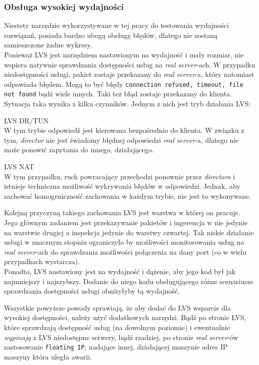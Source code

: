 \subsubsection*{Obsługa wysokiej wydajności}
Niestety narzędzie wykorzystywane w tej pracy do testowania wydajności rozwiązań, posiada bardzo ubogą obsługę błędów, dlatego nie zostaną zamieszczone żadne wykresy.\\
Ponieważ LVS jest narzędziem nastawionym na wydajność i mały rozmiar, nie wspiera natywnie sprawdzania dostępności usług na \textit{real server}-ach.
W przypadku niedostępności usługi, pakiet zostaje przekazany do \textit{real server}-a, który natomiast odpowiada błędem.
Mogą to być błędy \texttt{connection refused, timeout, file not found} bądź wiele innych.
Taki też błąd zostaje przekazany do klienta.\\
Sytuacja taka wynika z kilku czynników.
Jednym z nich jest tryb działania LVS:
\begin{description}
	\item{LVS DR/TUN}\\
		W tym trybie odpowiedź jest kierowana bezpośrednio do klienta.
		W związku z tym, \textit{director} nie jest świadomy błędnej odpowiedzi \textit{real server}-a, dlatego nie może ponowić zapytania do innego, działającego.
	\item{LVS NAT}\\
		W tym przypadku, ruch powracający przechodzi ponownie przez \textit{directora} i istnieje techniczna możliwość wykrywania błędów w odpowiedzi.
		Jednak, aby zachować homogeniczność zachowania w każdym trybie, nie jest to wykonywane.
\end{description}
Kolejną przyczyną takiego zachowania LVS jest warstwa w której on pracuje.
Jego głównym zadaniem jest przekazywanie pakietów i ingerencja w nie jedynie na warstwie drugiej a inspekcja jedynie do warstwy czwartej.
Tak niskie działanie usługi w znacznym stopniu ograniczyło by możliwości monitorowania usług na \textit{real server}-ach do sprawdzania możliwości połączenia na dany port (co w wielu przypadkach wystarcza).\\
Ponadto, LVS nastawiony jest na wydajność i dążenie, aby jego kod był jak najmniejszy i najszybszy.
Dodanie do niego kodu obsługującego różne scenariusze sprawdzania dostępności usługi obniżyłyby tą wydajność.

Wszystkie powyższe powody sprawiają, że aby dodać do LVS wsparcie dla wysokiej dostępności, należy użyć dodatkowych narzędzi.
Bądź po stronie LVS, które sprawdzają dostępność usług (na dowolnym poziomie) i ewentualnie \textit{wypinają} z LVS niedostępne serwery, bądź rzadziej, po stronie \textit{real server}-ów zastosowanie \texttt{floating IP}, nadające innej, działającej maszynie adres IP maszyny która uległa awarii.

